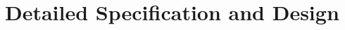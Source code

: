 \documentclass[report.tex]{subfiles}
\begin{document}
\chapter{Detailed Specification and Design} %

\newpage
\end{document}
